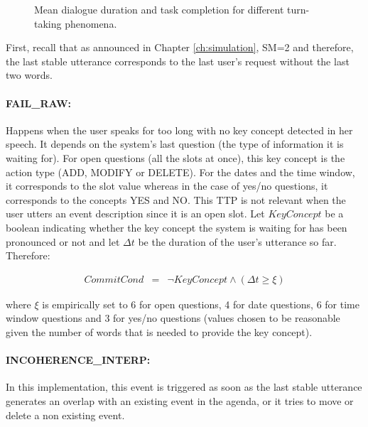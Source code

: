 \begin{figure*}[t]
\begin{minipage}{.47\textwidth}
			\end{minipage}
		\caption{Mean dialogue duration and task completion for different turn-taking phenomena.}
		\label{fig:ttp}
	\end{figure*}
    
    	First, recall that as announced in Chapter \ref{ch:simulation}, SM=2 and therefore, the last stable utterance corresponds to the last user's request without the last two words.
    
    	 \paragraph{FAIL\_RAW:} Happens when the user speaks for too long with no key concept detected in her speech. It depends on the system's last question (the type of information it is waiting for). For open questions (all the slots at once), this key concept is the action type (ADD, MODIFY or DELETE). For the dates and the time window, it corresponds to the slot value whereas in the case of yes/no questions, it corresponds to the concepts YES and NO. This TTP is not relevant when the user utters an event description since it is an open slot. Let $KeyConcept$ be a boolean indicating whether the key concept the system is waiting for has been pronounced or not and let $\Delta t$ be the duration of the user's utterance so far. Therefore:
			
			\begin{eqnarray}
				CommitCond & = & \neg KeyConcept \wedge (\Delta t \geq \xi) \nonumber
			\end{eqnarray}
			
			where $\xi$ is empirically set to 6 for open questions, 4 for date questions, 6 for time window questions and 3 for yes/no questions (values chosen to be reasonable given the number of words that is needed to provide the key concept).
         
         \paragraph{INCOHERENCE\_INTERP:} In this implementation, this event is triggered as soon as the last stable utterance generates an overlap with an existing event in the agenda, or it tries to move or delete a non existing event.
         
